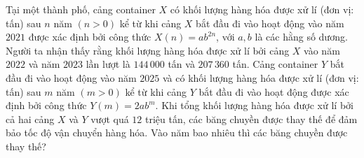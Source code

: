 \begin{ex}
Tại một thành phố, cảng container $X$ có khối lượng hàng hóa được xử lí (đơn vị: tấn) sau $n$ năm $(n>0)$ kể từ khi cảng $X$ bắt đầu đi vào hoạt động vào năm $2021$ được xác định bởi công thức $X(n)=ab^{2n}$, với $a,b$ là các hằng số dương. Người ta nhận thấy rằng khối lượng hàng hóa được xử lí bởi cảng $X$ vào năm $2022$ và năm $2023$ lần lượt là $144\,000$ tấn và $207\,360$ tấn. Cảng container $Y$ bắt đầu đi vào hoạt động vào năm $2025$ và có khối lượng hàng hóa được xử lí (đơn vị: tấn) sau $m$ năm $(m>0)$ kể từ khi cảng $Y$ bắt đầu đi vào hoạt động được xác định bởi công thức $Y(m)=2ab^m$. Khi tổng khối lượng hàng hóa được xử lí bởi cả hai cảng $X$ và $Y$ vượt quá $12$ triệu tấn, các băng chuyền được thay thế để đảm bảo tốc độ vận chuyển hàng hóa. Vào năm bao nhiêu thì các băng chuyền được thay thế?
\end{ex}
